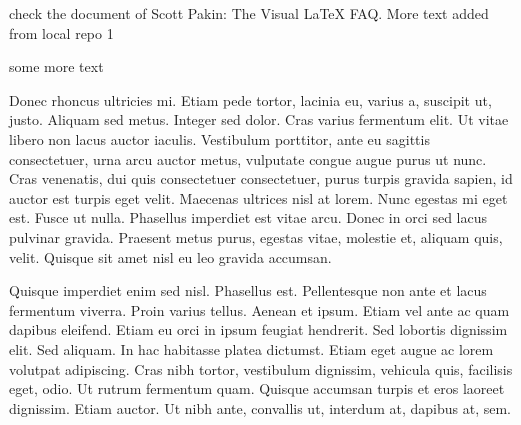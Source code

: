 \documentclass[12pt]{article}
\begin{document}



check the document of Scott Pakin: The Visual LaTeX FAQ.
More text added from local repo 1

\vspace{10mm}
some more text


\noindent
Donec rhoncus ultricies mi. Etiam pede tortor, lacinia eu, varius a, suscipit ut, justo. Aliquam sed metus. Integer sed dolor. Cras varius fermentum elit. Ut vitae libero non lacus auctor iaculis. Vestibulum porttitor, ante eu sagittis consectetuer, urna arcu auctor metus, vulputate congue augue purus ut nunc. Cras venenatis, dui quis consectetuer consectetuer, purus turpis gravida sapien, id auctor est turpis eget velit. Maecenas ultrices nisl at lorem. Nunc egestas mi eget est. Fusce ut nulla. Phasellus imperdiet est vitae arcu. Donec in orci sed lacus pulvinar gravida. Praesent metus purus, egestas vitae, molestie et, aliquam quis, velit. Quisque sit amet nisl eu leo gravida accumsan.

Quisque imperdiet enim sed nisl. Phasellus est. Pellentesque non ante et lacus fermentum viverra. Proin varius tellus. Aenean et ipsum. Etiam vel ante ac quam dapibus eleifend. Etiam eu orci in ipsum feugiat hendrerit. Sed lobortis dignissim elit. Sed aliquam. In hac habitasse platea dictumst. Etiam eget augue ac lorem volutpat adipiscing. Cras nibh tortor, vestibulum dignissim, vehicula quis, facilisis eget, odio. Ut rutrum fermentum quam. Quisque accumsan turpis et eros laoreet dignissim. Etiam auctor. Ut nibh ante, convallis ut, interdum at, dapibus at, sem.
\end{document}
